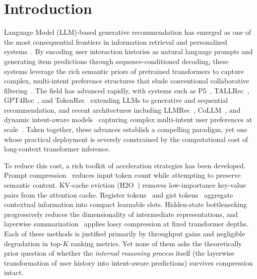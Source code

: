 \documentclass[lettersize,journal]{IEEEtran}
\begin{document}
\section{Introduction}
 Language Model (LLM)-based generative recommendation has emerged as one of the most consequential frontiers in information retrieval and personalized systems~\cite{wu2024survey,lin2024rec}. By encoding user interaction histories as natural language prompts and generating item predictions through sequence-conditioned decoding, these systems leverage the rich semantic priors of pretrained transformers to capture complex, multi-intent preference structures that elude conventional collaborative filtering~\cite{dai2023uncovering,bao2023tallrec,geng2022p5}. The field has advanced rapidly, with systems such as P5~\cite{geng2022p5}, TALLRec~\cite{bao2023tallrec}, GPT4Rec~\cite{li2023gpt4rec}, and TokenRec~\cite{qu2025tokenrec} extending LLMs to generative and sequential recommendation, and recent architectures including LLMRec~\cite{wei2024llmrec}, CoLLM~\cite{zhang2025collm}, and dynamic intent-aware models~\cite{qian2025harnessing} capturing complex multi-intent user preferences at scale~\cite{hou2022unisrec,yu2025bidirectionally,luo2026integrating,yu2025causal,hu2025exact,xu2026spatial}. Taken together, these advances establish a compelling paradigm, yet one whose practical deployment is severely constrained by the computational cost of long-context transformer inference.

To reduce this cost, a rich toolkit of acceleration strategies has been developed. Prompt compression~\cite{jiang2023longllmlingua} reduces input token count while attempting to preserve semantic content. KV-cache eviction (H2O~\cite{zhang2024h2o}) removes low-importance key-value pairs from the attention cache. Register tokens~\cite{darcet2024vision} and gist tokens~\cite{mu2024learning} aggregate contextual information into compact learnable slots. Hidden-state bottlenecking~\cite{ge2024context} progressively reduces the dimensionality of intermediate representations, and layerwise summarization~\cite{kim2024compressed} applies lossy compression at fixed transformer depths. Each of these methods is justified primarily by throughput gains and negligible degradation in top-$K$ ranking metrics. Yet none of them asks the theoretically prior question of whether the \emph{internal reasoning process} itself (the layerwise transformation of user history into intent-aware predictions) survives compression intact.
\end{document}
